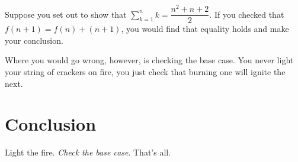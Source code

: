 Suppose you set out to show that $\sum\limits_{k=1}^{n} k = \dfrac{n^2+n+2}{2}$. If you checked that $f(n+1) = f(n) + (n+1)$, you would find that equality holds and make your conclusion.

Where you would go wrong, however, is checking the base case. You never light your string of crackers on fire, you just check that burning one will ignite the next.

\section*{Conclusion}
Light the fire. \textit{Check the base case}. That's all.

